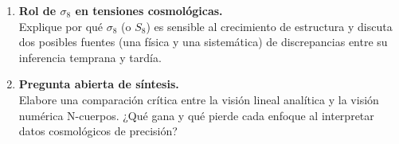 \begin{enumerate}[leftmargin=2.2em, label=\textbf{P\arabic*.}]
\item \textbf{Rol de $\sigma_8$ en tensiones cosmológicas.} \\
Explique por qué $\sigma_8$ (o $S_8$) es sensible al crecimiento de estructura y discuta dos posibles fuentes (una física y una sistemática) de discrepancias entre su inferencia temprana y tardía.

\item \textbf{Pregunta abierta de síntesis.} \\
Elabore una comparación crítica entre la visión lineal analítica y la visión numérica N-cuerpos. ¿Qué gana y qué pierde cada enfoque al interpretar datos cosmológicos de precisión?

\end{enumerate}
